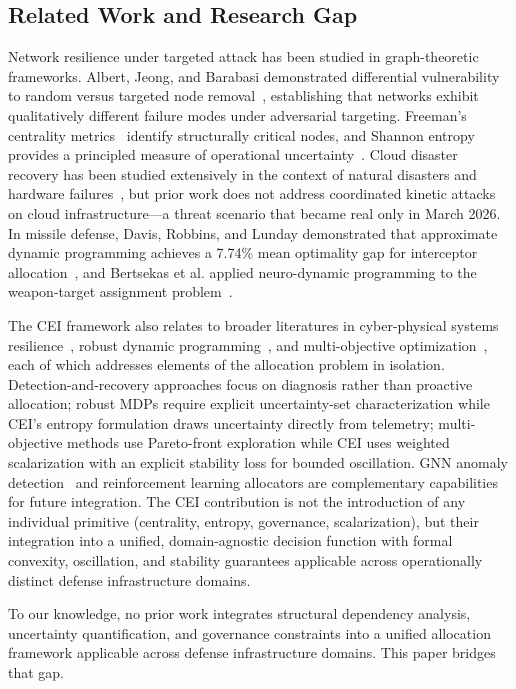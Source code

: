 \documentclass[runningheads]{llncs}
\begin{document}
\subsection{Related Work and Research Gap}

Network resilience under targeted attack has been studied in graph-theoretic frameworks. Albert, Jeong, and Barabasi demonstrated differential vulnerability to random versus targeted node removal~\cite{albert}, establishing that networks exhibit qualitatively different failure modes under adversarial targeting. Freeman's centrality metrics~\cite{freeman,freitas2021} identify structurally critical nodes, and Shannon entropy~\cite{shannon,tosi2025} provides a principled measure of operational uncertainty~\cite{cover}. Cloud disaster recovery has been studied extensively in the context of natural disasters and hardware failures~\cite{bala,gill}, but prior work does not address coordinated kinetic attacks on cloud infrastructure---a threat scenario that became real only in March 2026. In missile defense, Davis, Robbins, and Lunday demonstrated that approximate dynamic programming achieves a 7.74\% mean optimality gap for interceptor allocation~\cite{davis_adp}, and Bertsekas et al. applied neuro-dynamic programming to the weapon-target assignment problem~\cite{bertsekas}.

The CEI framework also relates to broader literatures in cyber-physical systems resilience~\cite{pasqualetti,sandberg}, robust dynamic programming~\cite{nilim,iyengar}, and multi-objective optimization~\cite{marler,deb}, each of which addresses elements of the allocation problem in isolation. Detection-and-recovery approaches focus on diagnosis rather than proactive allocation; robust MDPs require explicit uncertainty-set characterization while CEI's entropy formulation draws uncertainty directly from telemetry; multi-objective methods use Pareto-front exploration while CEI uses weighted scalarization with an explicit stability loss for bounded oscillation. GNN anomaly detection~\cite{deng} and reinforcement learning allocators are complementary capabilities for future integration. The CEI contribution is not the introduction of any individual primitive (centrality, entropy, governance, scalarization), but their integration into a unified, domain-agnostic decision function with formal convexity, oscillation, and stability guarantees applicable across operationally distinct defense infrastructure domains.

To our knowledge, no prior work integrates structural dependency analysis, uncertainty quantification, and governance constraints into a unified allocation framework applicable across defense infrastructure domains. This paper bridges that gap.
\end{document}
